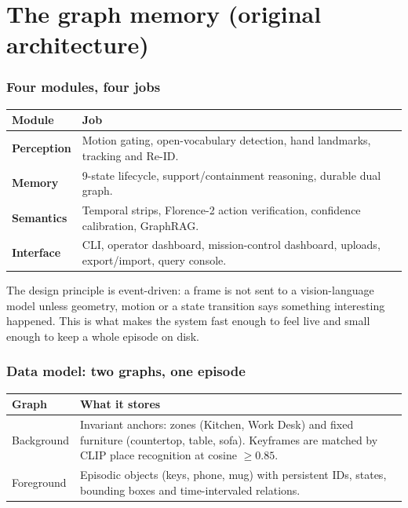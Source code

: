 \documentclass[10pt,a4paper]{article}
\makeatletter
\newcommand{\kw}[1]{\textcolor{accent2}{\textbf{#1}}}
\newcommand{\needspace}[1]{%
  \par\penalty-100
  \begingroup
  \dimen@=#1\relax
  \ifdim\pagegoal<\maxdimen
    \advance\dimen@\pagetotal
    \ifdim\dimen@>\pagegoal
      \vfil\break
    \fi
  \fi
  \endgroup}
\makeatother
\begin{document}
\needspace{9\baselineskip}
\part{The graph memory (original architecture)}

\section{Four modules, four jobs}

\begin{center}
\small
\begin{tabularx}{\linewidth}{@{}l L@{}}
\toprule
\textbf{Module} & \textbf{Job} \\
\midrule
\kw{Perception} & Motion gating, open-vocabulary detection, hand landmarks, tracking and Re-ID. \\
\kw{Memory} & 9-state lifecycle, support/containment reasoning, durable dual graph. \\
\kw{Semantics} & Temporal strips, Florence-2 action verification, confidence calibration, GraphRAG. \\
\kw{Interface} & CLI, operator dashboard, mission-control dashboard, uploads, export/import, query console. \\
\bottomrule
\end{tabularx}
\end{center}

\noindent
The design principle is event-driven: a frame is not sent to a vision-language model unless geometry,
motion or a state transition says something interesting happened. This is what makes the system fast
enough to feel live and small enough to keep a whole episode on disk.

\section{Data model: two graphs, one episode}

\begin{center}
\small
\begin{tabularx}{\linewidth}{@{}l L@{}}
\toprule
\textbf{Graph} & \textbf{What it stores} \\
\midrule
Background & Invariant anchors: zones (Kitchen, Work Desk) and fixed furniture (countertop, table,
sofa). Keyframes are matched by CLIP place recognition at cosine \(\geq 0.85\). \\
Foreground & Episodic objects (keys, phone, mug) with persistent IDs, states, bounding boxes and
time-intervaled relations. \\
\bottomrule
\end{tabularx}
\end{center}
\end{document}
